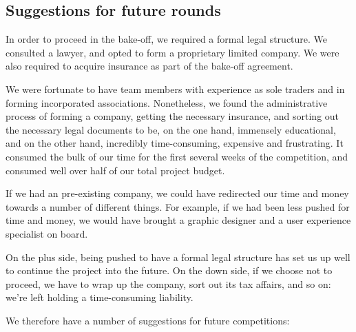 \documentclass[12pt,a4paper,twosided]{article}
\begin{document}
\subsection{Suggestions for future rounds}

In order to proceed in the bake-off, we required a formal legal
structure. We consulted a lawyer, and opted to form a proprietary
limited company. We were also required to acquire insurance as part of
the bake-off agreement.

We were fortunate to have team members with experience as sole traders
and in forming incorporated associations. Nonetheless, we found the
administrative process of forming a company, getting the necessary
insurance, and sorting out the necessary legal documents to be, on the
one hand, immensely educational, and on the other hand, incredibly
time-consuming, expensive and frustrating. It consumed the bulk of our
time for the first several weeks of the competition, and consumed well
over half of our total project budget.

If we had an pre-existing company, we could have redirected our time and
money towards a number of different things. For example, if we had been
less pushed for time and money, we would have brought a graphic designer
and a user experience specialist on board.

On the plus side, being pushed to have a formal legal structure has set
us up well to continue the project into the future. On the down side, if
we choose not to proceed, we have to wrap up the company, sort out its
tax affairs, and so on: we're left holding a time-consuming liability.

We therefore have a number of suggestions for future competitions:
\end{document}
